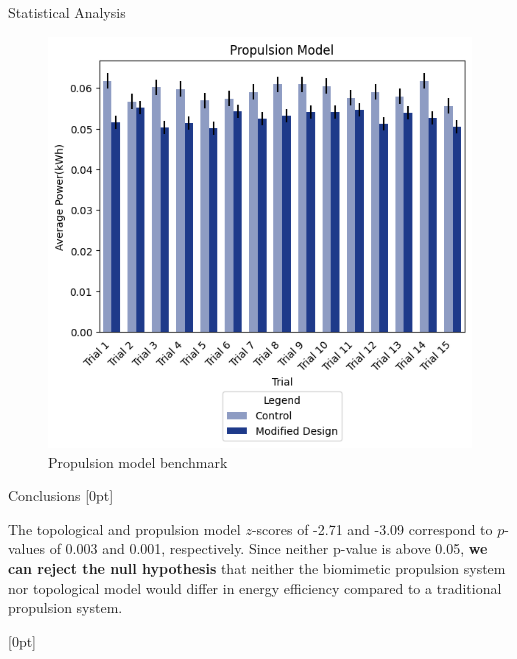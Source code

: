 \documentclass[final, 16pt]{beamer}
\newlength{\colwidth}
\begin{document}
\begin{frame}[t]
\begin{columns}[t]
\begin{column}{\colwidth}
\begin{block}{Statistical Analysis}
\begin{multicols}{2}
\begin{figure}[H]
        \centering
        \includegraphics[width=1.05\linewidth, height=1.25\linewidth]{img/Propulsion_Model_Benchmark.png}
        \caption{Propulsion model benchmark}
        \label{fig:propulsion-model-benchmark}
      \end{figure}
    \end{multicols}

  \end{block}

  \begin{block}{Conclusions}
    [0pt]

    The topological and propulsion model $z$-scores of -2.71 and -3.09 correspond to $p$-values of 0.003 and 0.001, respectively. Since neither p-value is above 0.05, \textbf{we can reject the null hypothesis} that neither the biomimetic propulsion system nor topological model would differ in energy efficiency compared to a traditional propulsion system. 
    
    [0pt]
    

\end{block}
\end{column}
\end{columns}
\end{frame}
\end{document}
